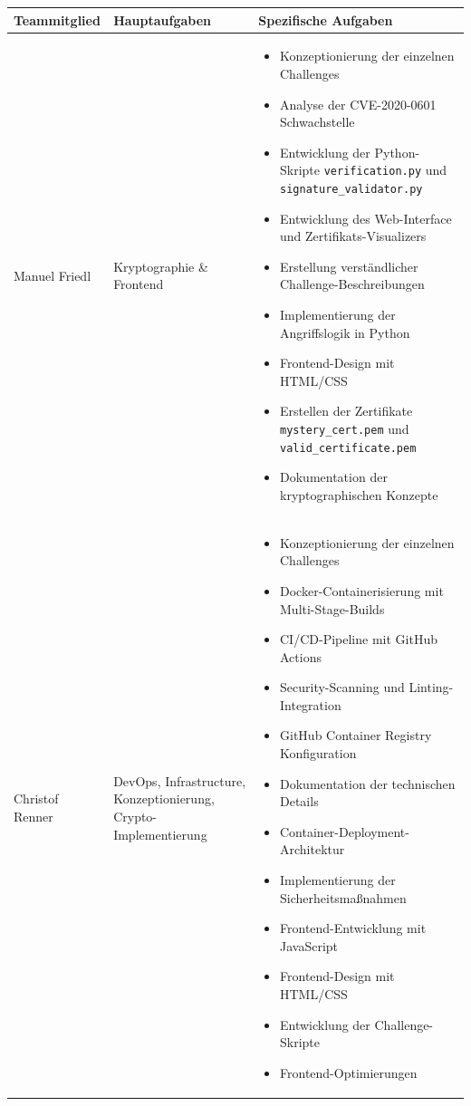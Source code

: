 \documentclass{article}
\begin{document}
\begin{longtable}{|p{3cm}|p{5cm}|p{6cm}|}
    \hline
    \textbf{Teammitglied} & \textbf{Hauptaufgaben} & \textbf{Spezifische Aufgaben} \\
    \hline
    \endhead

    Manuel Friedl & Kryptographie \& Frontend & 
    \begin{itemize}
        \item Konzeptionierung der einzelnen Challenges
        \item Analyse der CVE-2020-0601 Schwachstelle
        \item Entwicklung der Python-Skripte \texttt{verification.py} und \texttt{signature\_validator.py} 
        \item Entwicklung des Web-Interface und Zertifikats-Visualizers
        \item Erstellung verständlicher Challenge-Beschreibungen
        \item Implementierung der Angriffslogik in Python
        \item Frontend-Design mit HTML/CSS
        \item Erstellen der Zertifikate \texttt{mystery\_cert.pem} und \texttt{valid\_certificate.pem}
        \item Dokumentation der kryptographischen Konzepte
    \end{itemize} \\
    \hline

    Christof Renner & DevOps, Infrastructure, Konzeptionierung, Crypto-Implementierung  & 
    \begin{itemize}
        \item Konzeptionierung der einzelnen Challenges
        \item Docker-Containerisierung mit Multi-Stage-Builds
        \item CI/CD-Pipeline mit GitHub Actions
        \item Security-Scanning und Linting-Integration
        \item GitHub Container Registry Konfiguration
        \item Dokumentation der technischen Details
        \item Container-Deployment-Architektur
        \item Implementierung der Sicherheitsmaßnahmen
        \item Frontend-Entwicklung mit JavaScript
        \item Frontend-Design mit HTML/CSS
        \item Entwicklung der Challenge-Skripte
        \item Frontend-Optimierungen
    \end{itemize} \\
    \hline
    \end{longtable}
\end{document}
